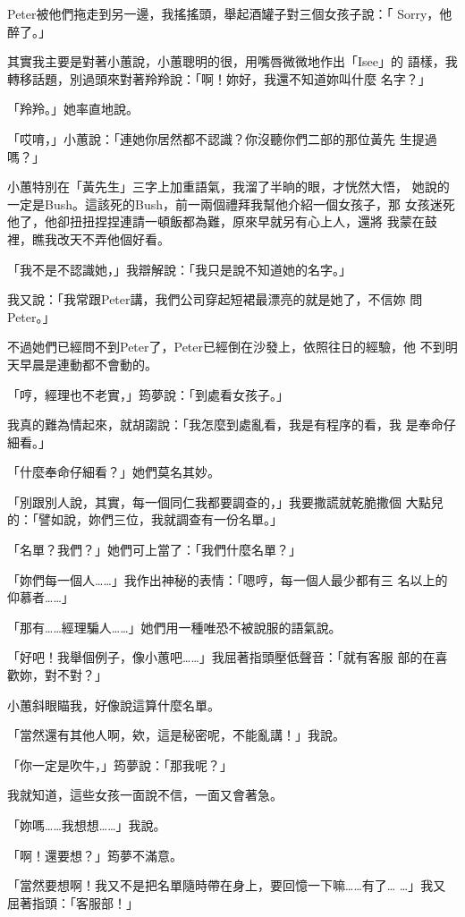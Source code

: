 Peter被他們拖走到另一邊，我搖搖頭，舉起酒罐子對三個女孩子說：「
Sorry，他醉了。」

其實我主要是對著小蕙說，小蕙聰明的很，用嘴唇微微地作出「Isee」的
語樣，我轉移話題，別過頭來對著羚羚說：「啊！妳好，我還不知道妳叫什麼
名字？」

「羚羚。」她率直地說。

「哎唷，」小蕙說：「連她你居然都不認識？你沒聽你們二部的那位黃先
生提過嗎？」

小蕙特別在「黃先生」三字上加重語氣，我溜了半晌的眼，才恍然大悟，
她說的一定是Bush。這該死的Bush，前一兩個禮拜我幫他介紹一個女孩子，那
女孩迷死他了，他卻扭扭捏捏連請一頓飯都為難，原來早就另有心上人，還將
我蒙在鼓裡，瞧我改天不弄他個好看。

「我不是不認識她，」我辯解說：「我只是說不知道她的名字。」

我又說：「我常跟Peter講，我們公司穿起短裙最漂亮的就是她了，不信妳
問Peter。」

不過她們已經問不到Peter了，Peter已經倒在沙發上，依照往日的經驗，他
不到明天早晨是連動都不會動的。

「哼，經理也不老實，」筠夢說：「到處看女孩子。」

我真的難為情起來，就胡謅說：「我怎麼到處亂看，我是有程序的看，我
是奉命仔細看。」

「什麼奉命仔細看？」她們莫名其妙。

「別跟別人說，其實，每一個同仁我都要調查的，」我要撒謊就乾脆撒個
大點兒的：「譬如說，妳們三位，我就調查有一份名單。」

「名單？我們？」她們可上當了：「我們什麼名單？」

「妳們每一個人……」我作出神秘的表情：「嗯哼，每一個人最少都有三
名以上的仰慕者……」

「那有……經理騙人……」她們用一種唯恐不被說服的語氣說。

「好吧！我舉個例子，像小蕙吧……」我屈著指頭壓低聲音：「就有客服
部的在喜歡妳，對不對？」

小蕙斜眼瞄我，好像說這算什麼名單。

「當然還有其他人啊，欸，這是秘密呢，不能亂講！」我說。

「你一定是吹牛，」筠夢說：「那我呢？」

我就知道，這些女孩一面說不信，一面又會著急。

「妳嗎……我想想……」我說。

「啊！還要想？」筠夢不滿意。

「當然要想啊！我又不是把名單隨時帶在身上，要回憶一下嘛……有了…
…」我又屈著指頭：「客服部！」


